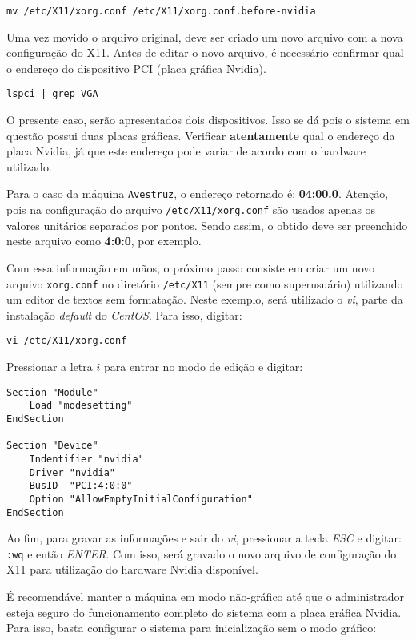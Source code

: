 \documentclass[twoside,a4paper,12pt,english]{inac17}
\begin{document}
\texttt{mv /etc/X11/xorg.conf /etc/X11/xorg.conf.before-nvidia}

Uma vez movido o arquivo original, deve ser criado um novo arquivo com a 
nova configuração do X11. Antes de editar o novo arquivo, é necessário 
confirmar qual o endereço do dispositivo PCI (placa gráfica Nvidia). 


\texttt{lspci | grep VGA}

O presente caso, serão apresentados dois dispositivos. Isso se dá pois o 
sistema em questão possui duas placas gráficas. Verificar \textbf{atentamente} 
qual o endereço da placa Nvidia, já que este endereço pode variar de acordo 
com o hardware utilizado.

\begin{shadedbox}
Para o caso da máquina \texttt{Avestruz}, o endereço retornado é: \textbf{04:00.0}. 
Atenção, pois na configuração do arquivo \texttt{/etc/X11/xorg.conf} são usados 
apenas os valores unitários separados por pontos. Sendo assim, o obtido deve 
ser preenchido neste arquivo como \textbf{4:0:0}, por exemplo.
\end{shadedbox}

Com essa informação em mãos, o próximo passo consiste em criar um novo arquivo 
\texttt{xorg.conf} no diretório \texttt{/etc/X11} (sempre como superusuário) 
utilizando um editor de textos sem formatação. Neste exemplo, será utilizado o 
\textit{vi}, parte da instalação \textit{default} do \textit{CentOS}. Para isso, 
digitar:

\texttt{vi /etc/X11/xorg.conf}

Pressionar a letra $i$ para entrar no modo de edição e digitar:

\begin{Verbatim}[tabsize=4]
Section "Module"
	Load "modesetting"
EndSection

Section "Device"
	Indentifier "nvidia"
	Driver "nvidia"
	BusID  "PCI:4:0:0"
	Option "AllowEmptyInitialConfiguration"
EndSection
\end{Verbatim}

Ao fim, para gravar as informações e sair do \textit{vi}, pressionar a tecla 
\textit{ESC} e digitar: \texttt{:wq} e então \textit{ENTER}. Com isso, será 
gravado o novo arquivo de configuração do X11 para utilização do hardware 
Nvidia disponível.

É recomendável manter a máquina em modo não-gráfico até que o administrador 
esteja seguro do funcionamento completo do sistema com a placa gráfica Nvidia. 
Para isso, basta configurar o sistema para inicialização sem o modo gráfico:
\end{document}
